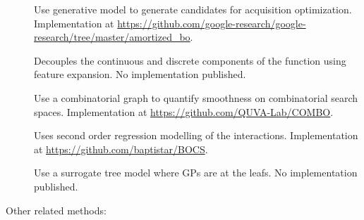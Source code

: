 \documentclass[
    american,a4paper
    ]{scrartcl}
\begin{document}
        \begin{description}
            \item[\cite{pmlr-v124-swersky20a}] Use generative model to generate candidates for acquisition optimization. Implementation at \url{https://github.com/google-research/google-research/tree/master/amortized_bo}.
            \item[\cite{daxberger2019mixed}] Decouples the continuous and discrete components of the function using feature expansion. No implementation published.
            \item[\cite{oh2019combinatorial}] Use a combinatorial graph to quantify smoothness on combinatorial search spaces. Implementation at \url{https://github.com/QUVA-Lab/COMBO}.
            \item[\cite{baptista2018bayesian}] Uses second order regression modelling of the interactions. Implementation at \url{https://github.com/baptistar/BOCS}.
            \item[\cite{pmlr-v70-jenatton17a}] Use a surrogate tree model where GPs are at the leafs. No implementation published.
        \end{description}
        Other related methods:
\end{document}
